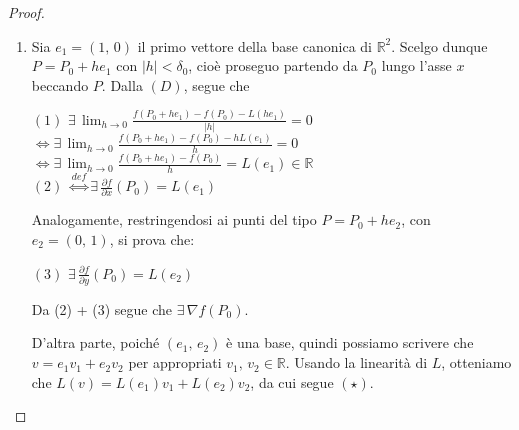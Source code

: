 \begin{proof}
\begin{enumerate}[labelindent=\parindent,leftmargin=*,label=\textnormal{(\roman*)},start=1]
\item
Sia $e_1=(1,\,0)$ il primo vettore della base canonica di $\mathbb{R}^2$. Scelgo dunque $P=P_0+he_1$ con $|h|<\delta_0$, cioè proseguo partendo da $P_0$ lungo l'asse $x$ beccando $P$. Dalla $(D)$, segue che
	\begin{center}
	$\mathrm{(1)}$
	\hfill
	$\displaystyle \exists \, \lim_{h \rightarrow 0} \frac{f(P_0 + he_1) - f(P_0) - L(he_1)}{|h|} = 0$\hfill\null\\
	\hfill
	$\displaystyle \Longleftrightarrow \exists \, \lim_{h \rightarrow 0} \frac{f(P_0 + he_1) - f(P_0) - hL(e_1)}{h} = 0$\hfill\null\\
	\hfill
	$\displaystyle \Longleftrightarrow \exists \, \lim_{h \rightarrow 0} \frac{f(P_0 + he_1) - f(P_0)}{h} = L(e_1) \in \mathbb{R}$\hfill\null\\
	$\mathrm{(2)}$
	\hfill
	$\displaystyle \overset{def}{\Longleftrightarrow} \exists \, \frac{\partial f}{\partial x}(P_0) = L(e_1)$
	\hfill \null
	\end{center}
Analogamente, restringendosi ai punti del tipo $P=P_0+he_2$, con $e_2=(0,\,1)$, si prova che:
	\begin{center}
	$\mathrm{(3)}$
	\hfill
	$\displaystyle \exists \, \frac{\partial f}{\partial y}(P_0) = L(e_2)$\hfill\null
	\end{center}
Da (2) + (3) segue che $\exists \, \nabla f(P_0)$.

D'altra parte, poiché $(e_1,\,e_2)$ è una base, quindi possiamo scrivere che $v=e_1v_1 + e_2v_2$ per appropriati $v_1,\,v_2 \in \mathbb{R}$. Usando la linearità di $L$, otteniamo che $L(v)= L(e_1)v_1 + L(e_2)v_2$, da cui segue $(\star)$.


\end{enumerate}
\end{proof}
